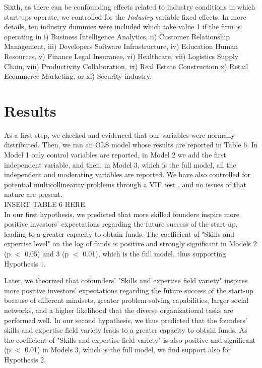 \documentclass[12pt]{article}
\begin{document}
Sixth, as there can be confounding effects related to industry conditions in which start-ups operate, we controlled for the \textit{Industry} variable fixed effects. In more details, ten industry dummies were included which take value 1 if the firm is operating in i) Business Intelligence Analytics, ii) Customer Relationship Management, iii) Developers Software Infrastructure, iv) Education Human Resources, v) Finance Legal Insurance, vi) Healthcare, vii) Logistics Supply Chain, viii) Productivity Collaboration, ix) Real Estate Construction x) Retail Ecommerce Marketing, or xi) Security industry.

\section{Results}

As a first step, we checked and evidenced that our variables were normally distributed. Then, we ran an OLS model whose results are reported in Table 6\label{table6}. In Model 1 only control variables are reported, in Model 2 we add the first independent variable, and then, in Model 3, which is the full model, all the independent and moderating variables are reported. We have also controlled for potential multicollinearity problems through a VIF test \citep{james2013introduction}, and no issues of that nature are present. \\

INSERT TABLE 6 HERE. \\

In our first hypothesis, we predicted that more skilled founders inspire more positive investors’ expectations regarding the future success of the start-up, leading to a greater capacity to obtain funds. The coefficient of "Skills and expertise level" on the log of funds is positive and strongly significant in Models 2 (p $<$ 0.05) and 3 (p $<$ 0.01), which is the full model, thus supporting Hypothesis 1.

Later, we theorized that cofounders’ "Skills and expertise field variety" inspires more positive investors’ expectations regarding the future success of the start-up because of different mindsets, greater problem-solving capabilities, larger social networks, and a higher likelihood that the diverse organizational tasks are performed well. In our second hypothesis, we thus predicted that the founders’ skills and expertise field variety leads to a greater capacity to obtain funds. As the coefficient of "Skills and expertise field variety" is also positive and significant (p $<$ 0.01) in Models 3, which is the full model, we find support also for Hypothesis 2.
\end{document}
